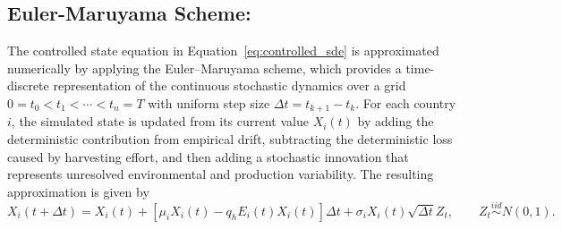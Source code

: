 \documentclass[11pt]{article}
\begin{document}
	\subsection{Euler-Maruyama Scheme:}
	
	The controlled state equation in Equation~\eqref{eq:controlled_sde} is approximated numerically by applying the Euler--Maruyama scheme, which provides a time-discrete representation of the continuous stochastic dynamics over a grid $0=t_0<t_1<\cdots<t_n=T$ with uniform step size $\Delta t=t_{k+1}-t_k$. For each country $i$, the simulated state is updated from its current value $X_i(t)$ by adding the deterministic contribution from empirical drift, subtracting the deterministic loss caused by harvesting effort, and then adding a stochastic innovation that represents unresolved environmental and production variability. The resulting approximation is given by
	\begin{equation}
		X_i(t+\Delta t)
		=
		X_i(t)
		+
		\left[
		\mu_iX_i(t)-q_hE_i(t)X_i(t)
		\right]\Delta t
		+
		\sigma_iX_i(t)\sqrt{\Delta t}Z_t,
		\qquad
		Z_t\overset{iid}{\sim} N(0,1).
		\label{eq:euler_controlled}
	\end{equation}
\end{document}
